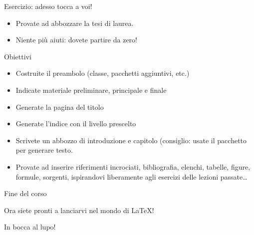 \documentclass{beamer}
\begin{document}
\begin{frame}{Esercizio: adesso tocca a voi!}
\begin{itemize}
\item Provate ad abbozzare la  tesi di laurea.
\item Niente pi\`u aiuti: dovete partire da zero!
\end{itemize}

\begin{block}{Obiettivi}
\begin{itemize}
\item Costruite il preambolo (classe, pacchetti aggiuntivi, etc.)
\item Indicate  materiale preliminare, principale e finale
\item Generate la pagina del titolo
\item Generate l'indice con il livello prescelto
\item Scrivete un abbozzo di introduzione e capitolo (consiglio: usate il pacchetto  per generare testo.
\item Provate ad inserire riferimenti incrociati, bibliografia, elenchi, tabelle, figure, formule, sorgenti, ispirandovi liberamente agli esercizi delle lezioni passate\ldots
\end{itemize}
\end{block}

\end{frame}

\begin{frame}{Fine del corso}
\begin{center}
Ora siete pronti a lanciarvi nel mondo di \LaTeX{}!

In bocca al lupo!
\end{center}
\end{frame}
\end{document}
